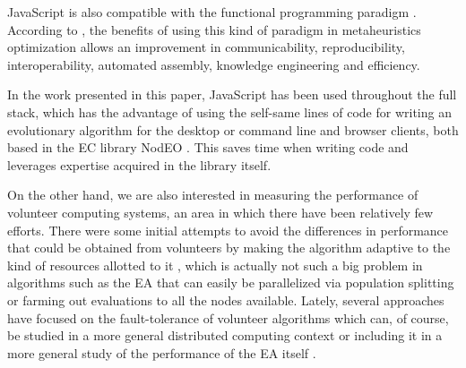 \documentclass[journal,onecolumn]{IEEEtran}
\begin{document}
JavaScript is also compatible with the functional programming paradigm \cite{Cousineau1998,MacLennan1990,Thompson1996}.
According to \cite{swanresearch2015}, the benefits of using this kind of paradigm in
metaheuristics optimization allows an improvement in communicability,
reproducibility, interoperability, automated assembly, knowledge engineering
and efficiency.

In the work presented in this paper, JavaScript has been used throughout the full
stack, which has the advantage of using the self-same lines of code for
writing an evolutionary algorithm for the
desktop or command line and browser clients, both based in the EC
library NodEO \cite{DBLP:conf/gecco/GuervosVGES14}. This saves time %
when writing code and leverages %
expertise acquired in the library itself. %



On the other hand, we are also interested in measuring the performance
of volunteer computing systems, an area in which there have been
relatively few efforts.
There were some initial attempts to avoid the differences in performance
that could be obtained from volunteers  by making
the algorithm adaptive to the kind of resources allotted to it
\cite{milani2004online}, which is actually not such a big problem in
algorithms such as the EA that can easily be
parallelized via population splitting or farming out evaluations to all
the nodes available. Lately, several approaches have focused on the
fault-tolerance of volunteer algorithms
\cite{gonzalez2010characterizing} which can, of course, be studied in
a more general distributed computing context
\cite{nogueras2015studying} or including it in a more general study of the
performance of the EA itself
\cite{DBLP:journals/gpem/LaredoBGVAGF14}.

\end{document}
